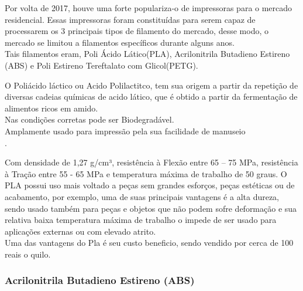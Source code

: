 Por volta de 2017, houve uma forte populariza-o de impressoras para o mercado residencial. Essas impressoras foram constituídas para serem capaz de processarem os 3 principais tipos de filamento do mercado, desse modo, o mercado se limitou a filamentos específicos durante alguns anos. \\[0.2cm]

Tais filamentos eram, Poli Ácido Lático(PLA), Acrilonitrila Butadieno Estireno (ABS) e Poli Estireno Tereftalato com Glicol(PETG).\\[0.2cm]








O Poliácido láctico ou Acido Polilactitco, tem sua origem a partir da repetição de diversas cadeias químicas de acido lático, que é obtido a partir da fermentação de alimentos ricos em amido.\\[0.2cm]

Nas condições corretas pode ser Biodegradável. \\[0.2cm]



Amplamente usado para impressão pela sua facilidade de manuseio\\[0.2cm] .



Com densidade de 1,27 g/cm³, resistência à Flexão entre 65 – 75 MPa, resistência à Tração entre 55 - 65 MPa e temperatura máxima de trabalho de 50 graus. O PLA possui uso mais voltado a peças sem grandes esforços, peças estéticas ou de acabamento,  por exemplo, uma de suas principais vantagens é a alta dureza, sendo usado também para peças e objetos que não podem sofre deformação e sua relativa baixa temperatura máxima de trabalho o impede de ser usado para aplicações externas ou com elevado atrito. \\[0.2cm]



Uma das vantagens do Pla é seu custo beneficio, sendo vendido por cerca de 100 reais o quilo.\\[0.2cm]







\subsubsection{Acrilonitrila Butadieno Estireno (ABS)}





